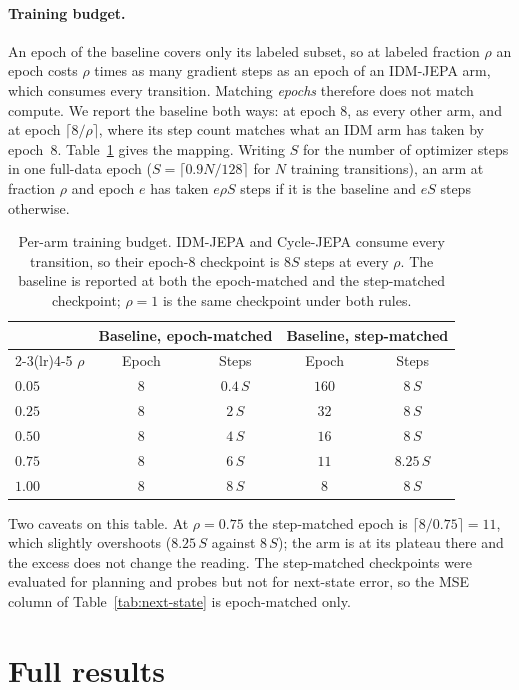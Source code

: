\documentclass{article}
\begin{document}
\paragraph{Training budget.}
\label{app:budget}
An epoch of the baseline covers only its labeled subset, so at labeled fraction
$\rho$ an epoch costs $\rho$ times as many gradient steps as an epoch of an
IDM-JEPA arm, which consumes every transition. Matching \emph{epochs} therefore
does not match compute. We report the baseline both ways: at epoch $8$, as every
other arm, and at epoch $\lceil 8/\rho \rceil$, where its step count matches what
an IDM arm has taken by epoch~8. Table~\ref{tab:budget-appendix} gives the
mapping. Writing $S$ for the number of optimizer steps in one full-data epoch
($S = \lceil 0.9 N / 128 \rceil$ for $N$ training transitions), an arm at
fraction $\rho$ and epoch $e$ has taken $e \rho S$ steps if it is the baseline
and $e S$ steps otherwise.

\begin{table}[h]
  \centering
  \small
  \caption{Per-arm training budget. IDM-JEPA and Cycle-JEPA consume every
    transition, so their epoch-8 checkpoint is $8S$ steps at every $\rho$. The
    baseline is reported at both the epoch-matched and the step-matched
    checkpoint; $\rho = 1$ is the same checkpoint under both rules.}
  \label{tab:budget-appendix}
  \begin{tabular}{lcccc}
    \toprule
    & \multicolumn{2}{c}{Baseline, epoch-matched} &
      \multicolumn{2}{c}{Baseline, step-matched} \\
    \cmidrule(lr){2-3}\cmidrule(lr){4-5}
    $\rho$ & Epoch & Steps & Epoch & Steps \\
    \midrule
    $0.05$ & $8$ & $0.4\,S$ & $160$ & $8\,S$ \\
    $0.25$ & $8$ & $2\,S$   & $32$  & $8\,S$ \\
    $0.50$ & $8$ & $4\,S$   & $16$  & $8\,S$ \\
    $0.75$ & $8$ & $6\,S$   & $11$  & $8.25\,S$ \\
    $1.00$ & $8$ & $8\,S$   & $8$   & $8\,S$ \\
    \bottomrule
  \end{tabular}
\end{table}

Two caveats on this table. At $\rho = 0.75$ the step-matched epoch is
$\lceil 8/0.75 \rceil = 11$, which slightly overshoots ($8.25\,S$ against
$8\,S$); the arm is at its plateau there and the excess does not change the
reading. The step-matched checkpoints were evaluated for planning and probes but
not for next-state error, so the MSE column of Table~\ref{tab:next-state} is
epoch-matched only.

\section{Full results}
\label{app:tables}


\end{document}
